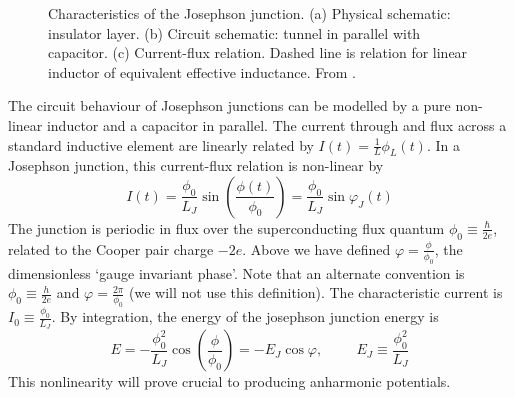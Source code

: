 \documentclass[11pt]{article}
\begin{document}
\begin{figure}[H]
	\centering
	\caption{Characteristics of the Josephson junction. (a) Physical schematic: insulator layer. (b) Circuit schematic: tunnel in parallel with capacitor. (c) Current-flux relation. Dashed line is relation for linear inductor of equivalent effective inductance. From \cite{vool2017introduction}.}
	\label{fig_jj}
\end{figure}

The circuit behaviour of Josephson junctions can be modelled by a pure non-linear inductor and a capacitor in parallel. The current through and flux across a standard inductive element are linearly related by $I(t) = \frac{1}{L} \phi_L(t)$. In a Josephson junction, this current-flux relation is non-linear by 
\begin{equation}
I(t) = \frac{\phi_0}{L_J} \sin{\left(\frac{\phi(t)}{\phi_0}\right)} = \frac{\phi_0}{L_J} \sin{\varphi_J(t)} 
\end{equation}
The junction is periodic in flux over the superconducting flux quantum $\phi_0 \equiv \frac{\hbar}{2e}$, related to the Cooper pair charge $-2e$. Above we have defined $\varphi = \frac{\phi}{\phi_0}$, the dimensionless `gauge invariant phase'.  Note that an alternate convention is $\phi_0 \equiv \frac{h}{2e}$ and $\varphi = \frac{2\pi}{\phi_0}$ (we will not use this definition). The characteristic current is $I_0 \equiv \frac{\phi_0}{L_J}$. By integration, the energy of the josephson junction energy is
\begin{equation}
E = - \frac{\phi_0^2}{L_J} \cos{\left(\frac{\phi}{\phi_0}\right)} = - E_J \cos{\varphi},
\hspace{1cm}
E_J \equiv \frac{\phi_0^2}{L_J}
\end{equation}
This nonlinearity will prove crucial to producing anharmonic potentials.
\end{document}
